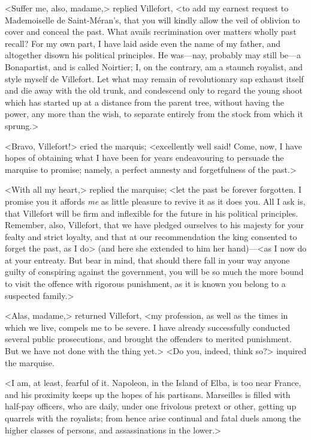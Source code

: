  <Suffer me, also, madame,> replied Villefort, <to add my earnest request to Mademoiselle de Saint-Méran's, that you will kindly allow the veil of oblivion to cover and conceal the past. What avails recrimination over matters wholly past recall? For my own part, I have laid aside even the name of my father, and altogether disown his political principles. He was—nay, probably may still be—a Bonapartist, and is called Noirtier; I, on the contrary, am a staunch royalist, and style myself de Villefort. Let what may remain of revolutionary sap exhaust itself and die away with the old trunk, and condescend only to regard the young shoot which has started up at a distance from the parent tree, without having the power, any more than the wish, to separate entirely from the stock from which it sprung.> 

 <Bravo, Villefort!> cried the marquis; <excellently well said! Come, now, I have hopes of obtaining what I have been for years endeavouring to persuade the marquise to promise; namely, a perfect amnesty and forgetfulness of the past.> 

 <With all my heart,> replied the marquise; <let the past be forever forgotten. I promise you it affords \textit{me} as little pleasure to revive it as it does you. All I ask is, that Villefort will be firm and inflexible for the future in his political principles. Remember, also, Villefort, that we have pledged ourselves to his majesty for your fealty and strict loyalty, and that at our recommendation the king consented to forget the past, as I do> (and here she extended to him her hand)—<as I now do at your entreaty. But bear in mind, that should there fall in your way anyone guilty of conspiring against the government, you will be so much the more bound to visit the offence with rigorous punishment, as it is known you belong to a suspected family.> 

 <Alas, madame,> returned Villefort, <my profession, as well as the times in which we live, compels me to be severe. I have already successfully conducted several public prosecutions, and brought the offenders to merited punishment. But we have not done with the thing yet.>  <Do you, indeed, think so?> inquired the marquise. 

 <I am, at least, fearful of it. Napoleon, in the Island of Elba, is too near France, and his proximity keeps up the hopes of his partisans. Marseilles is filled with half-pay officers, who are daily, under one frivolous pretext or other, getting up quarrels with the royalists; from hence arise continual and fatal duels among the higher classes of persons, and assassinations in the lower.> 

